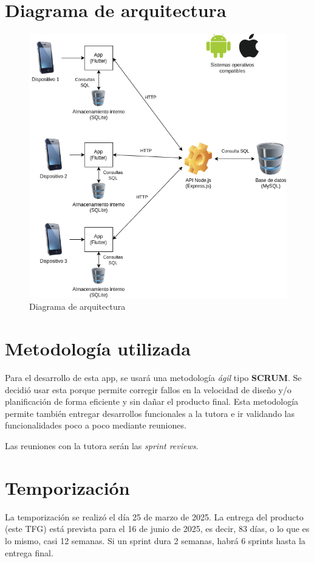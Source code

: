 \section{Diagrama de arquitectura}

\begin{figure}[H]
   \centering
    \includegraphics[width=\textwidth]{tablas/Arq.png}
    \caption{Diagrama de arquitectura}
    \label{fig:Arquitectura}
\end{figure} 

\section{Metodología utilizada}
Para el desarrollo de esta app, se usará una metodología \textit{ágil} tipo \textbf{SCRUM}. Se decidió usar esta porque permite corregir fallos en la velocidad de diseño y/o planificación de forma eficiente y sin dañar el producto final. Esta metodología permite también entregar desarrollos funcionales a la tutora e ir validando las funcionalidades poco a poco mediante reuniones.

Las reuniones con la tutora serán las \textit{sprint reviews}.

\section{Temporización}
La temporización se realizó el día 25 de marzo de 2025. La entrega del producto (este TFG) está prevista para el 16 de junio de 2025, es decir, 83 días, o lo que es lo mismo, casi 12 semanas. Si un sprint dura 2 semanas, habrá 6 sprints hasta la entrega final.


